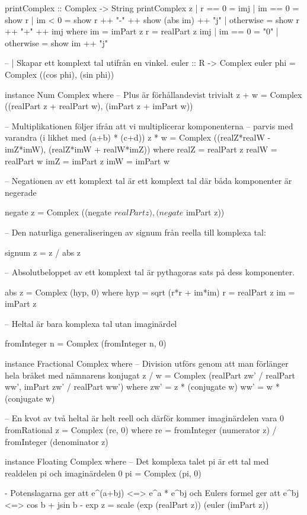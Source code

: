 \begin{codefig}
\begin{code}
printComplex :: Complex -> String
printComplex z
  | r == 0    = imj
  | im == 0   = show r
  | im < 0    = show r ++ "-" ++ show (abs im) ++ "j"
  | otherwise = show r ++ "+" ++ imj
    where im  = imPart z
          r   = realPart z
          imj
            | im == 0  = "0"
            | otherwise = show im ++ "j"

-- | Skapar ett komplext tal utifrån en vinkel.
euler :: R -> Complex
euler phi = Complex ((cos phi), (sin phi))

instance Num Complex where
-- Plus är förhållandevist trivialt
  z + w = Complex ((realPart z + realPart w), (imPart z + imPart w))

-- Multiplikationen följer ifrån att vi multiplicerar komponenterna
-- parvis med varandra (i likhet med (a+b) * (c+d))
  z * w = Complex ((realZ*realW - imZ*imW), (realZ*imW + realW*imZ))
    where realZ = realPart z
          realW = realPart w
          imZ   = imPart z
          imW   = imPart w

-- Negationen av ett komplext tal är ett komplext tal där båda komponenter är negerade

  negate z = Complex ((negate $ realPart z), (negate $ imPart z))

-- Den naturliga generaliseringen av signum från reella till komplexa tal:

  signum z = z / abs z

-- Absolutbeloppet av ett komplext tal är pythagoras sats på dess komponenter.

  abs z = Complex (hyp, 0)
    where hyp  = sqrt (r*r + im*im)
          r    = realPart z
          im   = imPart z

-- Heltal är bara komplexa tal utan imaginärdel

  fromInteger n = Complex (fromInteger n, 0)

instance Fractional Complex where
-- Division utförs genom att man förlänger hela bråket med nämnarens konjugat
  z / w = Complex (realPart zw' / realPart ww', imPart zw' / realPart ww')
    where zw' = z * (conjugate w)
          ww' = w * (conjugate w)

-- En kvot av två heltal är helt reell och därför kommer imaginärdelen vara 0
  fromRational z = Complex (re, 0)
    where re = fromInteger (numerator z) / fromInteger (denominator z)

instance Floating Complex where
-- Det komplexa talet pi är ett tal med realdelen pi och imaginärdelen 0
  pi = Complex (pi, 0)

{-
   Potenslagarna ger att e^(a+bj) <=> e^a * e^bj och
   Eulers formel ger att e^bj <=> cos b + jsin b
-}
  exp z = scale (exp (realPart z)) (euler (imPart z))


\end{code}
\end{codefig}
